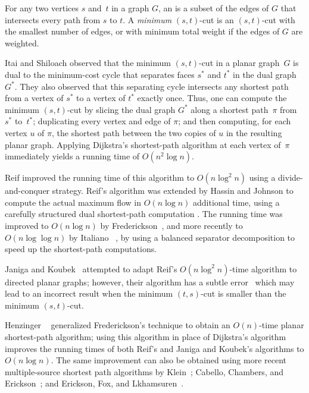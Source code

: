 \documentclass[letterpaper,review]{siamart190516}
\begin{document}
For any two vertices $s$ and~$t$ in a graph $G$, an  is a subset of the edges of $G$ that intersects every path from $s$ to $t$.  A \emph{minimum} $(s,t)$-cut is an $(s,t)$-cut with the smallest number of edges, or with minimum total weight if the edges of $G$ are weighted.

Itai and Shiloach \cite{is-mfpn-79} observed that the minimum $(s,t)$-cut in a planar graph~$G$ is dual to the minimum-cost cycle that separates faces $s^*$ and $t^*$ in the dual graph $G^*$.  They also observed that this separating cycle intersects any shortest path from a vertex of $s^*$ to a vertex of $t^*$ exactly once.  Thus, one can compute the minimum $(s,t)$-cut by slicing the dual graph $G^*$ along a shortest path~$\pi$ from $s^*$ to~$t^*$; duplicating every vertex and edge of $\pi$; and then computing, for each vertex $u$ of $\pi$, the shortest path between the two copies of $u$ in the resulting planar graph.  Applying Dijkstra's shortest-path algorithm at each vertex of~$\pi$ immediately yields a running time of $O(n^2\log n)$.

Reif \cite{r-mstcp-83} improved the running time of this algorithm to $O(n\log^2 n)$ using a divide-and-conquer strategy.  Reif's algorithm was extended by Hassin and Johnson to compute the actual maximum flow in $O(n\log n)$ additional time, using a carefully structured dual shortest-path computation \cite{hj-oamfu-85}.  The running time was improved to $O(n\log n)$ by Frederickson~\cite{f-faspp-87}, and more recently to $O(n\log\log n)$ by Italiano \etal~\cite{insw-iamcmf-11}, by using a balanced separator decomposition to speed up the shortest-path computations.

Janiga and Koubek~\cite{jk-mcdpn-92} attempted to adapt Reif's $O(n\log^2 n)$-time algorithm to directed planar graphs; however, their  algorithm has a subtle error~\cite{kn-mcupg-11} which may lead to an incorrect result when the minimum $(t,s)$-cut is smaller than the minimum $(s,t)$-cut.

Henzinger \etal~\cite{hkrs-fspap-97} generalized Frederickson's technique to obtain an $O(n)$-time
planar shortest-path algorithm; using this algorithm in place of Dijkstra's algorithm improves the
running times of both Reif's and Janiga and Koubek's algorithms to $O(n\log n)$.  The same
improvement can also be obtained using more recent multiple-source shortest path algorithms by
Klein~\cite{k-msspp-05}; Cabello, Chambers, and Erickson~\cite{cce-msspe-13}; and Erickson, Fox, and
Lkhamsuren~\cite{efl-hmcpf-18}.
\end{document}
